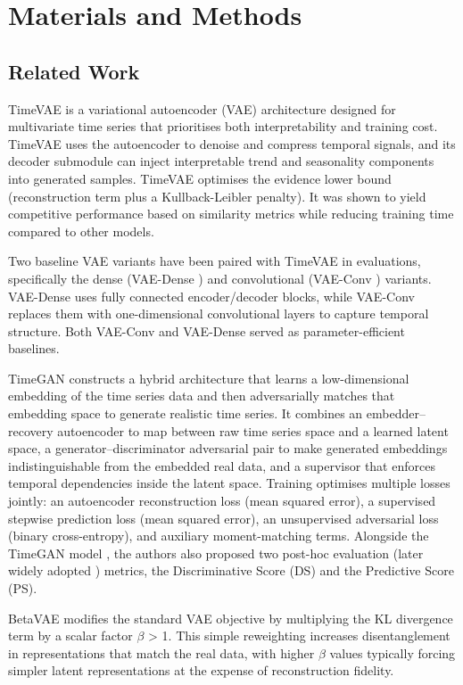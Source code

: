 \documentclass[make,article,submit,moreauthors]{Definitions/mdpi}
\begin{document}
\section{Materials and Methods}
\subsection{Related Work}
TimeVAE \cite{ref23} is a variational autoencoder (VAE) architecture designed for multivariate time series that prioritises both interpretability and training cost. TimeVAE uses the autoencoder to denoise and compress temporal signals, and its decoder submodule can inject interpretable trend and seasonality components into generated samples. TimeVAE optimises the evidence lower bound (reconstruction term plus a Kullback-Leibler penalty). It was shown to yield competitive performance based on similarity metrics while reducing training time compared to other models.

Two baseline VAE variants have been paired with TimeVAE \cite{ref23} in evaluations, specifically the dense (VAE-Dense \cite{ref23}) and convolutional (VAE-Conv \cite{ref23}) variants. VAE-Dense uses fully connected encoder/decoder blocks, while VAE-Conv replaces them with one-dimensional convolutional layers to capture temporal structure. Both VAE-Conv and VAE-Dense served as parameter-efficient baselines.

TimeGAN \cite{ref2} constructs a hybrid architecture that learns a low-dimensional embedding of the time series data and then adversarially matches that embedding space to generate realistic time series. It combines an embedder–recovery autoencoder to map between raw time series space and a learned latent space, a generator–discriminator adversarial pair to make generated embeddings indistinguishable from the embedded real data, and a supervisor that enforces temporal dependencies inside the latent space. Training optimises multiple losses jointly: an autoencoder reconstruction loss (mean squared error), a supervised stepwise prediction loss (mean squared error), an unsupervised adversarial loss (binary cross-entropy), and auxiliary moment-matching terms. Alongside the TimeGAN model \cite{ref2}, the authors also proposed two post-hoc evaluation (later widely adopted \cite{ref25}) metrics, the Discriminative Score (DS) and the Predictive Score (PS). 

BetaVAE \cite{ref26,ref27} modifies the standard VAE objective by multiplying the KL divergence term by a scalar factor $\beta$ > 1. This simple reweighting increases disentanglement in representations that match the real data, with higher $\beta$ values typically forcing simpler latent representations at the expense of reconstruction fidelity.
\end{document}
